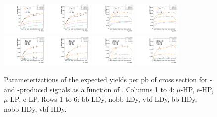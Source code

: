 \begin{figure}[htbp]
  \includegraphics[width=0.2\textwidth]{fig/2Dfit/paramSignalYield_NonVBFSig_mu_HP_nobb_HDy.pdf}
  \includegraphics[width=0.2\textwidth]{fig/2Dfit/paramSignalYield_NonVBFSig_e_HP_nobb_HDy.pdf}
  \includegraphics[width=0.2\textwidth]{fig/2Dfit/paramSignalYield_NonVBFSig_mu_LP_nobb_HDy.pdf}
  \includegraphics[width=0.2\textwidth]{fig/2Dfit/paramSignalYield_NonVBFSig_e_LP_nobb_HDy.pdf}\\
  \includegraphics[width=0.2\textwidth]{fig/2Dfit/paramSignalYield_NonVBFSig_mu_HP_vbf_HDy.pdf}
  \includegraphics[width=0.2\textwidth]{fig/2Dfit/paramSignalYield_NonVBFSig_e_HP_vbf_HDy.pdf}
  \includegraphics[width=0.2\textwidth]{fig/2Dfit/paramSignalYield_NonVBFSig_mu_LP_vbf_HDy.pdf}
  \includegraphics[width=0.2\textwidth]{fig/2Dfit/paramSignalYield_NonVBFSig_e_LP_vbf_HDy.pdf}\\
  \caption{
    Parameterizations of the expected yields per pb of cross section for \ggF- and \DY-produced signals as a function of \MX.
    Columns 1 to 4: $\mu$-HP, e-HP, $\mu$-LP, e-LP.
    Rows 1 to 6: bb-LDy, nobb-LDy, vbf-LDy, bb-HDy, nobb-HDy, vbf-HDy.
  }
  \label{fig:YieldParam_NonVBF_Run2}
\end{figure}

